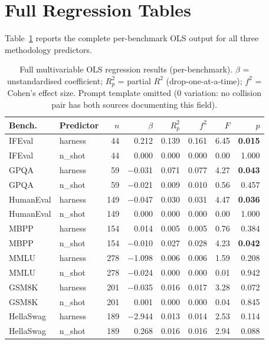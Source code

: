 \documentclass[11pt]{article}
\begin{document}
\clearpage
\section{Full Regression Tables}
\label{app:regression}

Table~\ref{tab:full_ols} reports the complete per-benchmark OLS
output for all three methodology predictors.

\begin{table}[t!]
\centering
\small
\setlength{\tabcolsep}{2.5pt}
\caption{Full multivariable OLS regression results (per-benchmark).
$\beta$ = unstandardised coefficient; $R^2_p$ = partial $R^2$ (drop-one-at-a-time);
$f^2$ = Cohen's effect size.
Prompt template omitted (0 variation: no collision pair has both sources documenting this field).}
\label{tab:full_ols}
\begin{tabular}{llrrrrrr}
\toprule
\textbf{Bench.} & \textbf{Predictor} & $n$ & $\beta$ & $R^2_p$ & $f^2$ & $F$ & $p$ \\
\midrule
IFEval & harness   &  44 & 0.212 & 0.139 & 0.161 & 6.45 & \textbf{0.015} \\
IFEval & n\_shot   &  44 & 0.000 & 0.000 & 0.000 & 0.00 & 1.000 \\
\midrule
GPQA & harness     &  59 & $-$0.031 & 0.071 & 0.077 & 4.27 & \textbf{0.043} \\
GPQA & n\_shot     &  59 & $-$0.021 & 0.009 & 0.010 & 0.56 & 0.457 \\
\midrule
HumanEval & harness & 149 & $-$0.047 & 0.030 & 0.031 & 4.47 & \textbf{0.036} \\
HumanEval & n\_shot & 149 & 0.000 & 0.000 & 0.000 & 0.00 & 1.000 \\
\midrule
MBPP & harness     & 154 & 0.014 & 0.005 & 0.005 & 0.76 & 0.384 \\
MBPP & n\_shot     & 154 & $-$0.010 & 0.027 & 0.028 & 4.23 & \textbf{0.042} \\
\midrule
MMLU & harness     & 278 & $-$1.098 & 0.006 & 0.006 & 1.59 & 0.208 \\
MMLU & n\_shot     & 278 & $-$0.024 & 0.000 & 0.000 & 0.01 & 0.942 \\
\midrule
GSM8K & harness    & 201 & $-$0.035 & 0.016 & 0.017 & 3.28 & 0.072 \\
GSM8K & n\_shot    & 201 & 0.001 & 0.000 & 0.000 & 0.04 & 0.845 \\
\midrule
HellaSwag & harness & 189 & $-$2.944 & 0.013 & 0.014 & 2.53 & 0.114 \\
HellaSwag & n\_shot & 189 & 0.268 & 0.016 & 0.016 & 2.94 & 0.088 \\
\bottomrule
\end{tabular}
\end{table}
\end{document}
